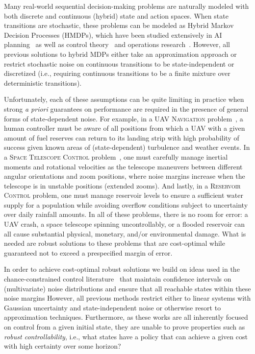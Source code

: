 
Many real-world sequential decision-making problems are naturally
modeled with both discrete and continuous (hybrid) state and action
spaces.  When state transitions are stochastic, these problems can be
modeled as Hybrid Markov Decision Processes (HMDPs), which have been
studied extensively in AI
planning~\cite{boyan01,feng04,li05,kveton06,phase07,hao09,zamani_aaai12}
as well as control theory~\cite{Henzinger:1997,Hu:2000,DeSHee:2009}
and operations research~\cite{puterman}.  However, all previous
solutions to hybrid MDPs either take an approximation approach or
restrict stochastic noise on continuous transitions to be
state-independent or discretized (i.e., requiring continuous
transitions to be a finite mixture over deterministic transitions).

Unfortunately, each of these assumptions can be quite limiting in
practice when strong \emph{a priori} guarantees on performance are
required in the presence of general forms of state-dependent noise.
For example, in a \textsc{UAV Navigation} problem~\cite{}, a human
controller must be aware of all positions from which a UAV with a
given amount of fuel reserves can return to its landing strip with
high probability of success given known areas of (state-dependent)
turbulence and weather events.  In a \textsc{Space Telescope Control}
problem~\cite{}, one must carefully manage inertial moments and
rotational velocities as the telescope maneuvers between different
angular orientations and zoom positions, where noise margins increase
when the telescope is in unstable positions (extended zooms).  And
lastly, in a \textsc{Reservoir Control} problem, one must manage
reservoir levels to ensure a sufficient water supply for a population
while avoiding overflow conditions subject to uncertainty over daily
rainfall amounts.  In all of these problems, there is no room for
error: a UAV crash, a space telescope spinning uncontrollably, or a
flooded reservoir can all cause substantial physical, monetary, and/or
environmental damage.  What is needed are robust solutions to these
problems that are cost-optimal while guaranteed not to exceed a
prespecified margin of error.

In order to achieve cost-optimal robust solutions we build on ideas
used in the chance-constrained control
literature~\cite{chwarm:1999,Li:2002,Ono:2008,Blackmore:2011} that
maintain confidence intervals on (multivariate) noise distributions
and ensure that all reachable states within these noise margins
However, all previous methods restrict either to linear systems with
Gaussian uncertainty and state-independent noise or otherwise resort
to approximation techniques.  Furthermore, as these works are all
inherently focused on control from a given initial state, they are
unable to prove properties such as \emph{robust controllability},
i.e., what states have a policy that can achieve a given cost with
high certainty over some horizon?

